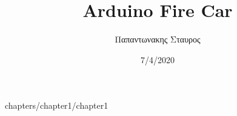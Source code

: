 \documentclass[a4paper,12pt]{article}
\author{Παπαντωνακης Σταυρος}
\title {Arduino Fire Car}
\date{7/4/2020}
\begin{document}
	
	
		
	\tableofcontents		
	\newpage
	 {chapters/chapter1/chapter1}
\end{document}
